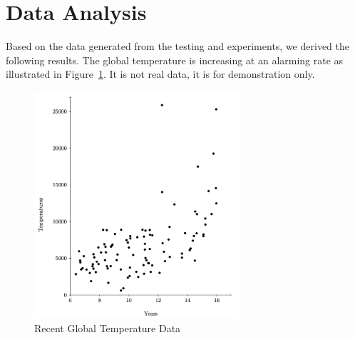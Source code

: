 \section{Data Analysis}

Based on the data generated from the testing and experiments, we derived the following results. The global temperature is increasing at an alarming rate as illustrated in Figure~\ref{fig:fig4}.  It is not real data, it is for demonstration only. 

  \begin{figure}[!ht]
 \centering
 \includegraphics[width=3in]{figures/plot.png}

  \caption{\label{fig:fig4} Recent Global Temperature Data}
  
  \end{figure}
  